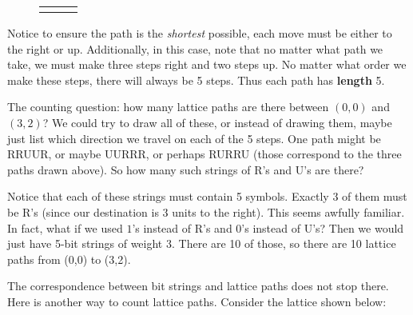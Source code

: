 \documentclass[10pt,]{book}
\newcommand{\terminology}[1]{\textbf{#1}}
\theoremstyle{plain}
\theoremstyle{definition}
\theoremstyle{definition}
\theoremstyle{definition}
\numberwithin{equation}{section}
\newlength{\panelmax}
\begin{document}
{\setlength{\tabcolsep}{0.0166666666666667\textwidth}
\begin{figure}
\hspace*{0.0166666666666667\textwidth}%
\begin{tabular}{@{}*{3}{c}@{}}
\begin{minipage}[c][\panelmax][t]{0.3\textwidth}\usebox{\panelboxAGimage}\end{minipage}&
\begin{minipage}[c][\panelmax][t]{0.3\textwidth}\usebox{\panelboxAHimage}\end{minipage}&
\begin{minipage}[c][\panelmax][t]{0.3\textwidth}\usebox{\panelboxAIimage}\end{minipage}\end{tabular}
\end{figure}
}%
\par

        Notice to ensure the path is the \emph{shortest} possible, each move must be either to the right or up. Additionally, in this case, note that no matter what path we take, we must make three steps right and two steps up. No matter what order we make these steps, there will always be 5 steps. Thus each path has \terminology{length} 5.
\par

        The counting question: how many lattice paths are there between \((0,0)\) and \((3,2)\)? We could try to draw all of these, or instead of drawing them, maybe just list which direction we travel on each of the 5 steps. One path might be RRUUR, or maybe UURRR, or perhaps RURRU (those correspond to the three paths drawn above). So how many such strings of R's and U's are there?
\par

        Notice that each of these strings must contain 5 symbols. Exactly 3 of them must be R's (since our destination is 3 units to the right). This seems awfully familiar. In fact, what if we used \(1\)'s instead of R's and 0's instead of U's? Then we would just have 5-bit strings of weight 3. There are 10 of those, so there are 10 lattice paths from (0,0) to (3,2).
\par

        The correspondence between bit strings and lattice paths does not stop there. Here is another way to count lattice paths. Consider the lattice shown below:
\leavevmode%
\begin{figure}
\centering
{
}
\end{figure}
\par
\end{document}
